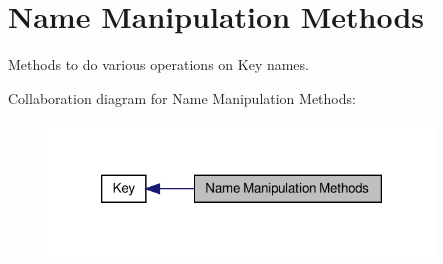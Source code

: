\hypertarget{group__keyname}{\section{Name Manipulation Methods}
\label{group__keyname}
}


Methods to do various operations on Key names.  


Collaboration diagram for Name Manipulation Methods\-:
\nopagebreak
\begin{figure}[H]
\begin{center}
\leavevmode
\includegraphics[width=290pt]{group__keyname}
\end{center}
\end{figure}
